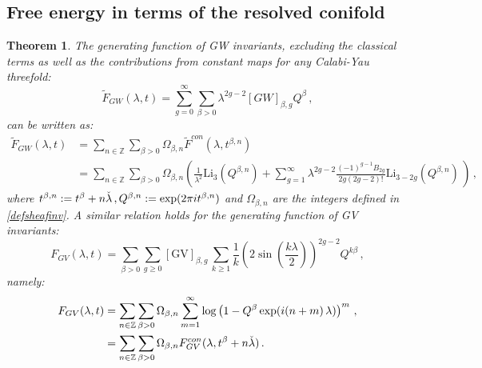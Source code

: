 \documentclass[a4paper,12pt,justification=centering]{article}
\numberwithin{equation}{section}
\newcommand{\ii}{\textnormal{i}}
\theoremstyle{plain}%
\newtheorem{thm}{Theorem}[section]
\theoremstyle{definition}
\begin{document}
\subsection{Free energy in terms of the resolved conifold}


\begin{thm}\label{thm:conifolds}
The generating function of GW invariants, excluding the classical terms as well as the contributions from constant maps for any Calabi-Yau threefold:
\begin{equation}
\tilde{F}_{GW}(\lambda,t)= \sum_{g=0}^{\infty}\sum_{\beta>0}  \lambda^{2g-2} [GW]_{\beta,g} Q^{\beta}\,,
\end{equation} 
can be written as:
\begin{align}
\tilde{F}_{GW}(\lambda,t)&=  \sum_{n\in \mathbb{Z}}  \sum_{\beta>0}   \Omega_{\beta,n} \widetilde{F}^{con} (\lambda, t^{\beta,n}) \, \\
&=\sum_{n\in \mathbb{Z}}  \sum_{\beta>0}   \Omega_{\beta,n}  \left( \frac{1}{\lambda^2} \mathrm{Li}_{3}(Q^{\beta,n})+ \sum_{g=1}^{\infty} \lambda^{2g-2} \frac{(-1)^{g-1}B_{2g}}{2g (2g-2)!} \mathrm{Li}_{3-2g} (Q^{\beta,n}) \, \right)\,,
\end{align}
where $t^{\beta,n}:=t^{\beta}+ n \check{\lambda}\,,Q^{\beta,n}:=\exp(2\pi \ii t^{\beta,n})$ and $\Omega_{\beta,n}$ are the integers defined in \eqref{defsheafinv}. A similar relation holds for the generating function of GV invariants:
\begin{equation}
F_{GV}(\lambda,t)  = \sum_{\beta>0}\sum_{g\ge 0} [\textrm{GV}]_{\beta,g}\, \sum_{k\ge 1} \frac{1}{k} \left( 2 \sin \left( \frac{k\lambda}{2}\right)\right)^{2g-2} Q^{k\beta}\,,
\end{equation}
namely:
\begin{align}
F_{GV}(\lambda,t)  &= \sum_{n\in \mathbb{Z}}  \sum_{\beta>0}   \Omega_{\beta,n}  \sum_{m=1}^{\infty} \log\left(1-   Q^{\beta}   \exp(\ii (n+m) \,\lambda) \right)^m  \,,\\
&=  \sum_{n\in \mathbb{Z}}  \sum_{\beta>0}   \Omega_{\beta,n} F_{GV}^{con} (\lambda, t^{\beta}+ n \check{\lambda}) \,.
\end{align}


\end{thm}
\end{document}
